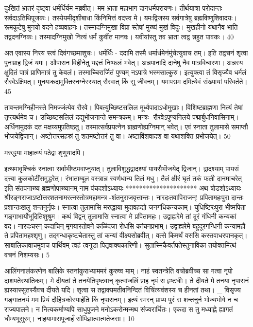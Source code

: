दुःखितं भ्रातरं दृष्ट्वा धर्मर्धिर्यम मब्रवीत्।
मम भ्राता महाभाग दानधर्मपरायणः।
तीर्थयात्रा परोदान्तः सर्वदाऽतिथिपूजकः।
तस्येयमीदृशीबाधा किंनिमित्तं वदस्व मे।
यमःद्विजस्य सर्वगात्रेषु ब्रह्मविष्णुशिवादयः।
रूमकूटेषु मुनयो वदने हव्यवाहनः।
तस्मादग्निमुखा विप्रा स्तेषां मुख्यं मुखं विदुः।
मुखहीनो यथानैव भाति तद्वदनग्निकः।
तस्मादग्निमुखो नित्यं धर्मं कुर्वीत मानवः।
यवीयांस्तु तव भ्राता त्वद्व न्नहुत पावकः।
40

अत एवास्य निरय स्त्वं दिवंगच्छमाशुचः।
धर्मर्धिः -
ददामि तस्मै धर्मार्धमेनंमुंचेत्युवाच तम्।
इति तद्वचनं शृत्वा पुनःप्राह द्विजं यमः।
औपासन विहीनेतु यद्दत्तं निष्फलं भवेत्।
अन्नपानादि दानेषु नैव पात्रविचारणा।
अन्नस्य क्षुदितं पात्रं प्राणिमात्रं तु केवलं।
तस्माच्चिरार्जितं पुण्यम् नऽपात्रे भस्मसात्कुरु।
इत्युक्त्वा तं विसृज्यैव धर्मलं रौरवेऽक्षिपत्।
मुनयःकदामुक्तिरनग्नेस्स्यात् रौरवात् किं सु जीवनम्।
यमःपद्मम दमित्येवं संख्यायां परिवर्तते।
45

तावन्तमग्निहीनस्ते निमज्जंत्येव रौरवे।
पिबत्युच्छिष्टसलिल मूर्ध्वपादाऽधोमुखाः।
विशिष्टब्राह्मणा नित्यं तेषां तृप्त्यर्थमेव च।
उच्छिष्टसलिलं दद्युभॊजनान्ते समन्त्रकम्।
मन्त्रः- रौरवेऽपुण्यनिलये पद्मार्बुधनिवासिनाम्।
अर्धिनामुदकं दत मक्षय्यमुपतिष्ठतु।
तस्मात्सर्वप्रयत्नेन ब्राह्मणोह्यग्निमान् भवेत्।
एवं स्नाता तुलामासे समाप्तौ भोजयेद्विजान्।
अष्टोत्तरसहस्रं तु शतमष्टोत्तरं तु वा।
अष्टाविंशवादश वा यथाशक्ति प्रभोजयेत्।
50

मरुद्धया माहात्म्यं पठेद्वा शृणुयादपि।

इत्थमावृश्चिकं स्नात्वा सर्वाभीष्टमवाप्नुयात्।
तुलाविशुद्धद्वादश्यां पायसैभॊजयेद् द्विजान्।
द्वादश्याम् पायसं दत्त्वा कुलकोटींसमुद्धरेत्।
रंभाताम्बूल वस्त्रान्न स्वर्णधान्य तिलं मधु।
तैलं क्षीरं घृतं तकं फली दानमाचरेत्।
इति संतपनाख्य ब्रह्मणोपाख्यानम् नाम
पंचदशोऽध्यायः
*********************
अथ षोडशोऽध्यायः श्रीरङ्गराजाऽष्टोत्तरशतनामरत्नस्तोत्रमहामन्त्र
-शंतनुराजवृत्तान्तः।
नारदःतवापिराजन्! प्रपितामहःपुरा दान्तः
प्रशान्तःखलु शन्तनुर्नृपः।
स्नात्वा तुलामासि मरुद्धाया
मुदावहद्यो जनगंधिकन्यकाम्।
युधिष्टिरःपुरा भीष्मपिता गङ्गाभार्योभूदितिशुश्रुम।
कथं विद्वन् तुलामासि स्नात्वा मे प्रपितामहः।
उद्वाह्यरेमे तां दूरं गंधिनी कन्यकां वद।
नारदःचरन् कदाचिन् मृगयारतोवने
कळिंदजा रोधसि कांचनप्रभाम्।
उद्वाह्यरेमे बहुदूरगन्धिनी
कन्यामहौ ते प्रपितामहश्शृणु।
तद्गन्धाकृष्टचेतास्तु तां कन्यां वीक्ष्यसोब्रवीत्।
वत्से किमर्थं वससि कस्तवाधरपानकृत्।
साबालिकावाचमुवाच पार्थिवम्
त्वहं त्वनूडा पितृवाक्यकारिणी।
सुतास्मिकैवर्तपतेस्तुनाविका
तयोक्तमित्थं वचनं निशम्यसः।
5

आलिंगनालंकरणेन बालिके
स्तनांकुराभ्याममरं कुरुष्व माम्।
नाहं स्वतन्त्रेति वचोब्रवीच्च सा
गत्वा नृपो दाशपतेरथांतिकम्।
मे दीयतां ते तनयेतिपृष्टवान्
कृत्वांजलिं प्राह नृपं स हृष्टधीः।
ते दीयते मे तनया नृपासनं
ह्यस्यास्सुतस्यैवच दीयते यदि।
शृत्वा स तद्वाक्यमतीवनिन्दितं
विचिंत्यवंशस्य च हीनतां तथा।
_ विसृज्य गङ्गातनयं मम प्रियं
दौहित्रकोस्यार्हति किं नृपासनम्।
इत्थं स्मरन् प्राप्य पुरं स शन्तनुर्न
भोज्यभोगे न च राज्यपालने।
न नित्यकर्माण्यपि साधुपूजने मनोऽकरोन्मन्मथ संज्वरार्धितः।
एकदा स तु मध्याह्ने ह्यागतं धौम्यभूसुरम्।
नाहयामासपूजाहँ सोपिज्ञात्वात्मतेजसा।
10

